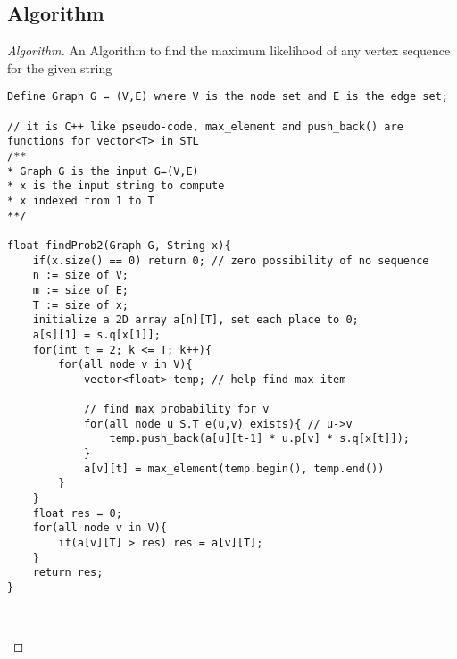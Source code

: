 \documentclass[openany]{article}
\begin{document}
\subsection*{Algorithm}
\begin{proof}[Algorithm]{}
		\renewcommand{\qedsymbol}{}
		An Algorithm to find the maximum likelihood of any vertex sequence for the given string
		\begin{lstlisting}[basicstyle=\fontsize{8}{9}\selectfont\ttfamily]
Define Graph G = (V,E) where V is the node set and E is the edge set;

// it is C++ like pseudo-code, max_element and push_back() are functions for vector<T> in STL
/**
* Graph G is the input G=(V,E)
* x is the input string to compute
* x indexed from 1 to T
**/

float findProb2(Graph G, String x){
    if(x.size() == 0) return 0; // zero possibility of no sequence
    n := size of V;
    m := size of E;
    T := size of x;
    initialize a 2D array a[n][T], set each place to 0;
    a[s][1] = s.q[x[1]];
    for(int t = 2; k <= T; k++){
        for(all node v in V){
            vector<float> temp; // help find max item
            
            // find max probability for v
            for(all node u S.T e(u,v) exists){ // u->v
                temp.push_back(a[u][t-1] * u.p[v] * s.q[x[t]]);
            }
            a[v][t] = max_element(temp.begin(), temp.end())
        }
    }
    float res = 0;
    for(all node v in V){
        if(a[v][T] > res) res = a[v][T];
    }
    return res;
}

        
		\end{lstlisting} 
\end{proof}
\end{document}
